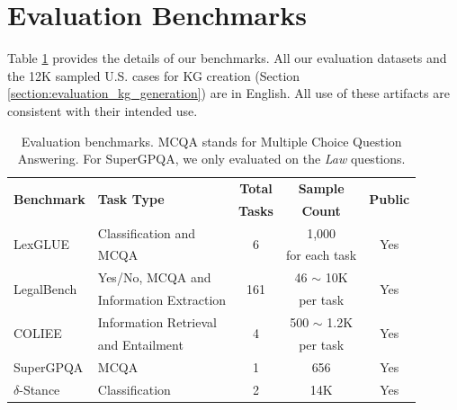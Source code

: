 \section{Evaluation Benchmarks}
\label{section:appendix_benchmark}

Table \ref{table:evaluation_benchmarks} provides the details of our benchmarks. All our evaluation datasets and the 12K sampled U.S. cases for KG creation (Section \ref{section:evaluation_kg_generation}) are in English. All use of these artifacts are consistent with their intended use.
\begin{table}[ht]
  \centering
  \begin{tabular}{llccc}
    \hline
    \multirow{2}{*}{\textbf{Benchmark}} &  \multirow{2}{*}{\textbf{Task Type}} & \textbf{Total} & \textbf{Sample} & \multirow{2}{*}{\textbf{Public}} \\
    & & \textbf{Tasks} & \textbf{Count} & \\ \hline
    \multirow{2}{*}{LexGLUE \citep{DBLP:journals/corr/abs-2304-12202}} & Classification and &  \multirow{2}{*}{6} & 1,000 &  \multirow{2}{*}{Yes} \\
     & MCQA & & for each task & \\
     \hline
    \multirow{2}{*}{LegalBench \citep{DBLP:conf/nips/GuhaNHRCKCPWRZT23}} & Yes/No, MCQA and &  \multirow{2}{*}{161} & 46 $\sim$ 10K &  \multirow{2}{*}{Yes} \\
    & Information Extraction & & per task & \\
    \hline
    \multirow{2}{*}{COLIEE \citep{DBLP:journals/rss/RabeloGKKYS22}} & Information Retrieval &  \multirow{2}{*}{4} & 500 $\sim$ 1.2K &  \multirow{2}{*}{Yes} \\
    & and Entailment & & per task & \\
    \hline
    SuperGPQA \citep{DBLP:journals/corr/abs-2502-14739} & MCQA & 1 & 656 & Yes \\
   \hline
    $\delta$-Stance \cite{DBLP:conf/acl/GuptaR025} & Classification & 2 & 14K & Yes \\
   \hline
  \end{tabular}
  \caption{\label{table:evaluation_benchmarks}
    Evaluation benchmarks. MCQA stands for Multiple Choice Question Answering. For SuperGPQA, we only evaluated on the \textit{Law} questions.
  }
\end{table}